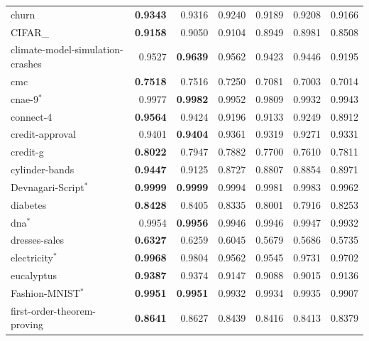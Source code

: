 {\begin{longtable}{>{\raggedright\arraybackslash}p{3.3cm}rrrrrr}
churn & \textbf{\num{0.9343}} & \num{0.9316} & \num{0.9240} & \num{0.9189} & \num{0.9208} & \num{0.9166} \\
CIFAR\_\allowbreak 10 & \textbf{\num{0.9158}} & \num{0.9050} & \num{0.9104} & \num{0.8949} & \num{0.8981} & \num{0.8508} \\
climate-model-simulation-crashes & \num{0.9527} & \textbf{\num{0.9639}} & \num{0.9562} & \num{0.9423} & \num{0.9446} & \num{0.9195} \\
cmc & \textbf{\num{0.7518}} & \num{0.7516} & \num{0.7250} & \num{0.7081} & \num{0.7003} & \num{0.7014} \\
cnae-9$^{*}$ & \num{0.9977} & \textbf{\num{0.9982}} & \num{0.9952} & \num{0.9809} & \num{0.9932} & \num{0.9943} \\
connect-4 & \textbf{\num{0.9564}} & \num{0.9424} & \num{0.9196} & \num{0.9133} & \num{0.9249} & \num{0.8912} \\
credit-approval & \num{0.9401} & \textbf{\num{0.9404}} & \num{0.9361} & \num{0.9319} & \num{0.9271} & \num{0.9331} \\
credit-g & \textbf{\num{0.8022}} & \num{0.7947} & \num{0.7882} & \num{0.7700} & \num{0.7610} & \num{0.7811} \\
cylinder-bands & \textbf{\num{0.9447}} & \num{0.9125} & \num{0.8727} & \num{0.8807} & \num{0.8854} & \num{0.8971} \\
Devnagari-Script$^{*}$ & \textbf{\num{0.9999}} & \textbf{\num{0.9999}} & \num{0.9994} & \num{0.9981} & \num{0.9983} & \num{0.9962} \\
diabetes & \textbf{\num{0.8428}} & \num{0.8405} & \num{0.8335} & \num{0.8001} & \num{0.7916} & \num{0.8253} \\
dna$^{*}$ & \num{0.9954} & \textbf{\num{0.9956}} & \num{0.9946} & \num{0.9946} & \num{0.9947} & \num{0.9932} \\
dresses-sales & \textbf{\num{0.6327}} & \num{0.6259} & \num{0.6045} & \num{0.5679} & \num{0.5686} & \num{0.5735} \\
electricity$^{*}$ & \textbf{\num{0.9968}} & \num{0.9804} & \num{0.9562} & \num{0.9545} & \num{0.9731} & \num{0.9702} \\
eucalyptus & \textbf{\num{0.9387}} & \num{0.9374} & \num{0.9147} & \num{0.9088} & \num{0.9015} & \num{0.9136} \\
Fashion-MNIST$^{*}$ & \textbf{\num{0.9951}} & \textbf{\num{0.9951}} & \num{0.9932} & \num{0.9934} & \num{0.9935} & \num{0.9907} \\
first-order-theorem-proving & \textbf{\num{0.8641}} & \num{0.8627} & \num{0.8439} & \num{0.8416} & \num{0.8413} & \num{0.8379} \\

\end{longtable}}
